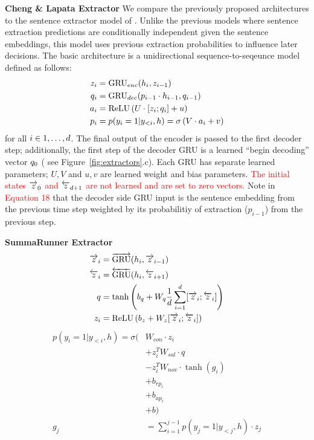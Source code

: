\textbf{Cheng \& Lapata Extractor} 
We compare the previously proposed architectures to the sentence extractor
model of \cite{chenglapata}. Unlike the previous models where
sentence extraction predictions are conditionally independent given
the sentence embeddings, this model uses previous extraction probabilities to
influence later decisions. The basic architecture is a unidirectional
sequence-to-seqeunce
model defined as follows:
\begin{align}
    z_i &= \operatorname{GRU}_{enc}(h_i, z_{i-1}) \\
    q_i &= \operatorname{GRU}_{dec}(p_{i-1} \cdot h_{i-1}, q_{i-1}) \\
   a_i &= \operatorname{ReLU}\left(U \cdot [z_i; q_i] + u \right)\\
    p_i &= p(y_i=1|y_{<i}, h) = \sigma\left(V\cdot a_i + v  \right) 
\end{align}
for all $i \in 1, \ldots, d$.
The final output of the encoder is passed to the first decoder
step; additionally, the first step of the decoder GRU is a learned 
``begin decoding'' vector $q_0$ (
see Figure~\ref{fig:extractors}.c).
Each GRU has separate learned 
parameters; $U, V$ and $u, v$ are learned weight and bias parameters.
\textcolor{red}{The initial states $\overrightarrow{z}_0$ and $\overleftarrow{z}_{d + 1}$ are not 
learned and are set to zero vectors.}
 Note in \textcolor{red}{Equation 18} that 
the decoder side GRU input is the sentence embedding from the previous time
step weighted by its probabilitiy of extraction ($p_{i-1}$) from the 
previous step.


\textbf{SummaRunner Extractor}
\begin{align}
    \overrightarrow{z}_i &= \overrightarrow{\operatorname{GRU}}(h_i, \overrightarrow{z}_{i-1}) \\
    \overleftarrow{z}_i &= \overleftarrow{\operatorname{GRU}}(h_i, \overleftarrow{z}_{i+1}) \\
    q &= \tanh\left(b_q + W_q\frac{1}{d}\sum_{i=1}^{d} [\overrightarrow{z}_i; \overleftarrow{z}_i] \right)\\
    z_i &= \operatorname{ReLU}\left(b_z + W_z [\overrightarrow{z}_i; \overleftarrow{z}_i]\right)
  \end{align}
  \begin{align*}
      p(y_i=1|y_{<i}, h) = \sigma(& W_{con}\cdot z_i \\
                     & + z_i^T W_{sal}\cdot q \\
                     & -z_i^T W_{nov} \cdot \tanh(g_i) \\
                     & + b_{rp_i}  \\
                     & + b_{ap_i} \\
                     & + b)     \\
      g_j & = \sum_{i=1}^{j-1} p(y_j=1|y_{<j},h) \cdot z_j
\end{align*}


